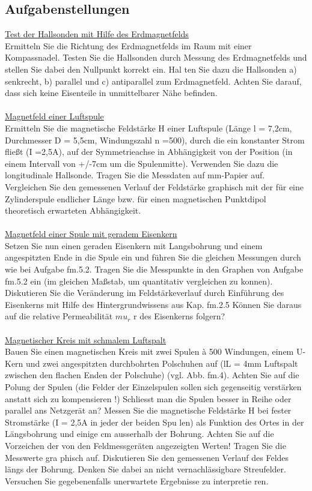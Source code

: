 \subsection{Aufgabenstellungen}
\underline{Test der Hallsonden mit Hilfe des Erdmagnetfelds}\\
Ermitteln Sie die Richtung des Erdmagnetfelds im Raum mit einer Kompassnadel. Testen Sie die
Hallsonden durch Messung des Erdmagnetfelds und stellen Sie dabei den Nullpunkt korrekt ein. Hal
ten Sie dazu die Hallsonden a) senkrecht, b) parallel und c) antiparallel zum Erdmagnetfeld. Achten
Sie darauf, dass sich keine Eisenteile in unmittelbarer Nähe befinden.
\\\\
\underline{Magnetfeld einer Luftspule}\\
Ermitteln Sie die magnetische Feldstärke H einer Luftspule (Länge l = 7,2cm, Durchmesser D = 5,5cm, Windungszahl n =500), durch die ein konstanter Strom fließt (I =2,5A), auf der Symmetrieachse in Abhängigkeit von der Position (in einem Intervall von +/-7cm um die Spulenmitte). Verwenden Sie dazu die longitudinale Hallsonde. Tragen Sie die Messdaten auf mm-Papier auf. Vergleichen
Sie den gemessenen Verlauf der Feldstärke graphisch mit der für eine Zylinderspule endlicher Länge
bzw. für einen magnetischen Punktdipol theoretisch erwarteten Abhängigkeit.
\\\\
\underline{Magnetfeld einer Spule mit geradem Eisenkern}\\
Setzen Sie nun einen geraden Eisenkern mit Langsbohrung und einem angespitzten Ende in die Spule
ein und führen Sie die gleichen Messungen durch wie bei Aufgabe fm.5.2. Tragen Sie die Messpunkte
in den Graphen von Aufgabe fm.5.2 ein (im gleichen Maßstab, um quantitativ vergleichen zu konnen).
Diskutieren Sie die Veränderung im Feldstärkeverlauf durch Einführung des Eisenkerns mit Hilfe
des Hintergrundwissens aus Kap. fm.2.5 Können Sie daraus auf die relative Permeabilität
$mu_r$ r des
Eisenkerns folgern?
\\\\
\underline{Magnetischer Kreis mit schmalem Luftspalt}\\
Bauen Sie einen magnetischen Kreis mit zwei Spulen à 500 Windungen, einem U-Kern und zwei angespitzten durchbohrten Polschuhen auf (lL = 4mm Luftspalt zwischen den flachen Enden der Polschuhe) (vgl. Abb. fm.4).
Achten Sie auf die Polung der Spulen (die Felder der Einzelspulen sollen sich gegenseitig verstärken
anstatt sich zu kompensieren !) Schliesst man die Spulen besser in Reihe oder parallel ans Netzgerät
an? Messen Sie die magnetische Feldstärke H bei fester Stromstärke (I = 2,5A in jeder der beiden Spu
len) als Funktion des Ortes in der Längsbohrung und einige cm ausserhalb der Bohrung. Achten Sie
auf die Vorzeichen der von den Feldmessgeräten angezeigten Werten! Tragen Sie die Messwerte gra
phisch auf.
Diskutieren Sie den gemessenen Verlauf des Feldes längs der Bohrung. Denken Sie dabei an nicht
vernachlässigbare Streufelder. Versuchen Sie gegebenenfalls unerwartete Ergebnisse zu interpretie
ren.\\

